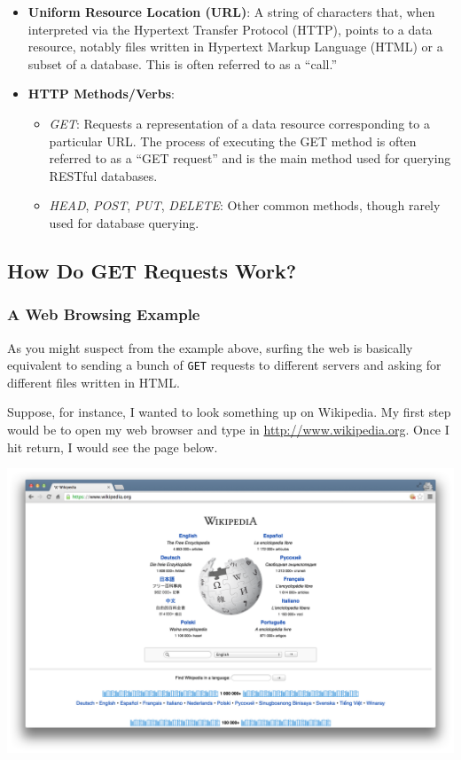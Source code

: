 \documentclass[]{book}
\begin{document}
\begin{itemize}
\item
  \textbf{Uniform Resource Location (URL)}: A string of characters that,
  when interpreted via the Hypertext Transfer Protocol (HTTP), points to
  a data resource, notably files written in Hypertext Markup Language
  (HTML) or a subset of a database. This is often referred to as a
  ``call.''
\item
  \textbf{HTTP Methods/Verbs}:

  \begin{itemize}
  \item
    \emph{GET}: Requests a representation of a data resource
    corresponding to a particular URL. The process of executing the GET
    method is often referred to as a ``GET request'' and is the main
    method used for querying RESTful databases.
  \item
    \emph{HEAD}, \emph{POST}, \emph{PUT}, \emph{DELETE}: Other common
    methods, though rarely used for database querying.
  \end{itemize}
\end{itemize}

\subsection{How Do GET Requests Work?}\label{how-do-get-requests-work}

\subsubsection*{A Web Browsing Example}\label{a-web-browsing-example}

As you might suspect from the example above, surfing the web is
basically equivalent to sending a bunch of \texttt{GET} requests to
different servers and asking for different files written in HTML.

Suppose, for instance, I wanted to look something up on Wikipedia. My
first step would be to open my web browser and type in
\url{http://www.wikipedia.org}. Once I hit return, I would see the page
below.

\begin{center}\includegraphics[width=0.7\linewidth]{img/wikipedia} \end{center}
\end{document}
